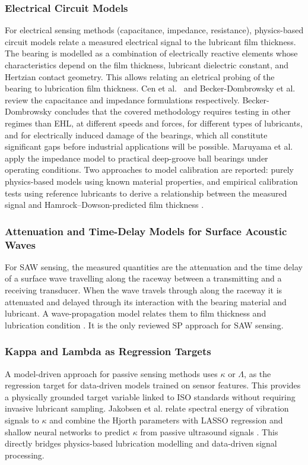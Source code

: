 \subsubsection{Electrical Circuit Models}
\label{subsubsec:electrical_model}
For electrical sensing methods (capacitance, impedance, resistance), physics-based circuit models relate a measured electrical signal to the lubricant film thickness. The bearing is modelled as a combination of electrically reactive elements whose characteristics depend on the film thickness, lubricant dielectric constant, and Hertzian contact geometry. This allows relating an eletrical probing of the bearing to lubrication film thickness. Cen et al.\ \cite{cen_ehl_2021} and Becker-Dombrowsky et al.\ \cite{becker-dombrowsky_electrical_2024} review the capacitance and impedance formulations respectively. Becker-Dombrowsky concludes that the covered methodology requires testing in other regimes than EHL, at different speeds and forces, for different types of lubricants, and for electrically induced damage of the bearings, which all constitute significant gaps before industrial applications will be possible. Maruyama et al.\ \cite{maruyama_lubrication_2023} apply the impedance model to practical deep-groove ball bearings under operating conditions. Two approaches to model calibration are reported: purely physics-based models using known material properties, and empirical calibration tests using reference lubricants to derive a relationship between the measured signal and Hamrock--Dowson-predicted film thickness \cite{cen_ehl_2021,schneider_method_2022}.

\subsubsection{Attenuation and Time-Delay Models for Surface Acoustic Waves}
\label{subsubsec:saw_model}
For SAW sensing, the measured quantities are the attenuation and the time delay of a surface wave travelling along the raceway between a transmitting and a receiving transducer. When the wave travels through along the raceway it is attenuated and delayed through its interaction with the bearing material and lubricant. A wave-propagation model relates them to film thickness and lubrication condition \cite{lindner_a23_2011}. It is the only reviewed SP approach for SAW sensing.

\subsubsection{Kappa and Lambda as Regression Targets}
\label{subsubsec:kappa_target}
A model-driven approach for passive sensing methods uses $\kappa$ or $\Lambda$, as the regression target for data-driven models trained on sensor features. This provides a physically grounded target variable linked to ISO standards without requiring invasive lubricant sampling. Jakobsen et al. relate spectral energy of vibration signals to $\kappa$ \cite{jakobsen_vibration_2021} and combine the Hjorth parameters with LASSO regression and shallow neural networks to predict $\kappa$ from passive ultrasound signals \cite{jakobsen_detecting_2023}. This directly bridges physics-based lubrication modelling and data-driven signal processing.

